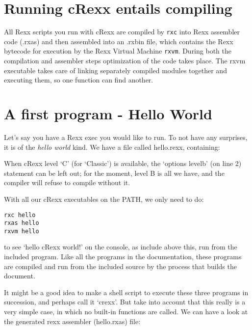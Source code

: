 \hypertarget{running-crexx-entails-compiling}{%
\section{Running cRexx entails
compiling}\label{running-crexx-entails-compiling}}

All Rexx scripts you run with cRexx are compiled by \texttt{rxc} into
Rexx assembler code (.rxas) and then assembled into an .rxbin file,
which contains the Rexx bytecode for execution by the Rexx Virtual
Machine \texttt{rxvm}. During both the compilation and assembler steps
optimization of the code takes place. The rxvm executable takes care of
linking separately compiled modules together and executing them, so one
function can find another.

\hypertarget{a-first-program---hello-world}{%
\section{A first program - Hello
World}\label{a-first-program---hello-world}}

Let's say you have a Rexx exec you would like to run. To not have any
surprises, it is of the \emph{hello world} kind. We have a file called
hello.rexx, containing:


\begin{shaded}
  \small
\obeylines {}
\end{shaded}

When cRexx level `C' (for `Classic') is available, the `options levelb'
(on line 2) statement can be left out; for the moment, level B is all we
have, and the compiler will refuse to compile without it.

With all our cRexx executables on the PATH, we only need to do:

\begin{verbatim}
rxc hello
rxas hello
rxvm hello
\end{verbatim}

to see `hello cRexx world!' on the console, as include above this, run
from the included program. Like all the programs in the \crexx{}
documentation, these programs are compiled and run from the included
source by the process that builds the document.

It might be a good idea to make a shell script to execute these three
programs in succession, and perhaps call it `crexx'. But take into
account that this really is a very simple case, in which no built-in
functions are called. We can have a look at the generated rexx assembler
(hello.rxas) file:

